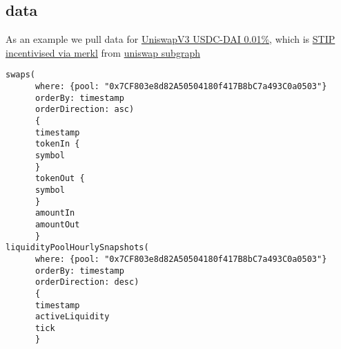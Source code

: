 \documentclass[12pt]{article}
\begin{document}
\subsection{data}
As an example we pull data for \href{https://arbiscan.io/address/0x7CF803e8d82A50504180f417B8bC7a493C0a0503}{UniswapV3 USDC-DAI 0.01\%}, which is \href{https://merkl.angle.money/pool-report?pool=0x7CF803e8d82A50504180f417B8bC7a493C0a0503&chain=42161&to=1708012167&from=1705592967}{STIP incentivised via merkl} from \href{https://thegraph.com/explorer/subgraphs/FQ6JYszEKApsBpAmiHesRsd9Ygc6mzmpNRANeVQFYoVX?view=Overview&chain=arbitrum-one}{uniswap subgraph}
\begin{verbatim}
swaps(
      where: {pool: "0x7CF803e8d82A50504180f417B8bC7a493C0a0503"}
      orderBy: timestamp
      orderDirection: asc)
      {
      timestamp    
      tokenIn {
      symbol
      }
      tokenOut {
      symbol
      }
      amountIn
      amountOut
      }    
liquidityPoolHourlySnapshots(
      where: {pool: "0x7CF803e8d82A50504180f417B8bC7a493C0a0503"}
      orderBy: timestamp
      orderDirection: desc) 
      {
      timestamp
      activeLiquidity
      tick
      }
\end{verbatim}
\end{document}
